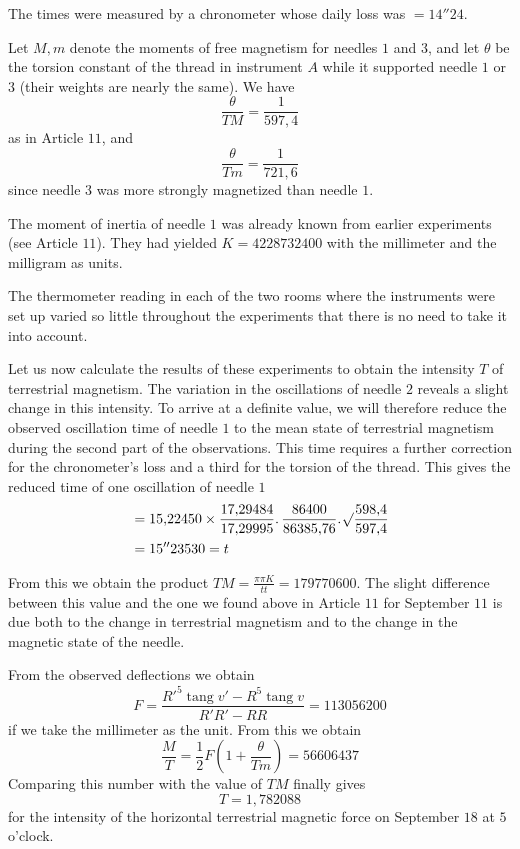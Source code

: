 The times were measured by a chronometer whose daily loss was $=14''24$.

Let $M,m$ denote the moments of free magnetism for needles $1$ and $3$, and let $\theta$ be the torsion constant of the thread in instrument $A$ while it supported needle $1$ or $3$ (their weights are nearly the same). We have
\[
\frac{\theta}{TM}=\frac1{597{,}4}
\]
as in Article $11$, and
\[
\frac{\theta}{Tm}=\frac1{721{,}6}
\]
since needle $3$ was more strongly magnetized than needle $1$.
\par
{}
The moment of inertia of needle $1$ was already known from earlier experiments (see Article $11$). They had yielded $K=4228732400$ with the millimeter and the milligram as units.

The thermometer reading in each of the two rooms where the instruments were set up varied so little throughout the experiments that there is no need to take it into account.

Let us now calculate the results of these experiments to obtain the intensity $T$ of terrestrial magnetism. The variation in the oscillations of needle $2$ reveals a slight change in this intensity. To arrive at a definite value, we will therefore reduce the observed oscillation time of needle $1$ to the mean state of terrestrial magnetism during the second part of the observations. This time requires a further correction for the chronometer's loss and a third for the torsion of the thread. This gives the reduced time of one oscillation of needle $1$
\[
\begin{aligned}
&=15{,}22450\times\frac{17{,}29484}{17{,}29995}\mathpunct{.}\frac{86400}{86385{,}76}\mathpunct{.}\mathord{{}^{}\!\surd}\frac{598{,}4}{597{,}4}\\
&=15''23530=t
\end{aligned}
\]

From this we obtain the product $TM=\frac{\pi\pi K}{tt}=179770600$. The slight difference between this value and the one we found above in Article $11$ for September $11$ is due both to the change in terrestrial magnetism and to the change in the magnetic state of the needle.

From the observed deflections we obtain
\[
F=\frac{R'^5\operatorname{tang}v'-R^5\operatorname{tang}v}{R'R'-RR}=113056200
\]
if we take the millimeter as the unit. From this we obtain
\[
\frac MT=\frac12F\left(1+\frac{\theta}{Tm}\right)=56606437
\]
Comparing this number with the value of $TM$ finally gives
\[
T=1{,}782088
\]
for the intensity of the horizontal terrestrial magnetic force on September $18$ at $5$ o'clock.

